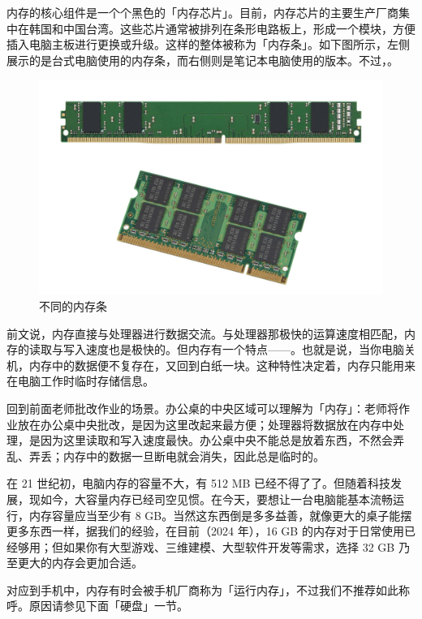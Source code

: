 内存的核心组件是一个个黑色的「内存芯片」。目前，内存芯片的主要生产厂商集中在韩国和中国台湾。这些芯片通常被排列在条形电路板上，形成一个模块，方便插入电脑主板进行更换或升级。这样的整体被称为「内存条」。如下图所示，左侧展示的是台式电脑使用的内存条，而右侧则是笔记本电脑使用的版本。不过，。

\begin{figure}[htb!]
  \centering
  \includegraphics[width=.7\textwidth]{assets/basic/RAMs.jpg}
  \caption{不同的内存条}
  \label{fig:RAMs}
\end{figure}

前文说，内存直接与处理器进行数据交流。与处理器那极快的运算速度相匹配，内存的读取与写入速度也是极快的。但内存有一个特点——。也就是说，当你电脑关机，内存中的数据便不复存在，又回到白纸一块。这种特性决定着，内存只能用来在电脑工作时临时存储信息。

回到前面老师批改作业的场景。办公桌的中央区域可以理解为「内存」：老师将作业放在办公桌中央批改，是因为这里改起来最方便；处理器将数据放在内存中处理，是因为这里读取和写入速度最快。办公桌中央不能总是放着东西，不然会弄乱、弄丢；内存中的数据一旦断电就会消失，因此总是临时的。

在 21 世纪初，电脑内存的容量不大，有 512 MB 已经不得了了。但随着科技发展，现如今，大容量内存已经司空见惯。在今天，要想让一台电脑能基本流畅运行，内存容量应当至少有 8 GB。当然这东西倒是多多益善，就像更大的桌子能摆更多东西一样，据我们的经验，在目前（2024 年），16 GB 的内存对于日常使用已经够用；但如果你有大型游戏、三维建模、大型软件开发等需求，选择 32 GB 乃至更大的内存会更加合适。

\begin{note}
  对应到手机中，内存有时会被手机厂商称为「运行内存」，不过我们不推荐如此称呼。原因请参见下面「硬盘」一节。
\end{note}


